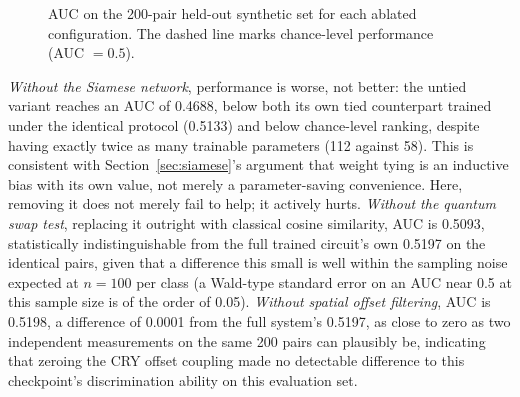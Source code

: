 \documentclass[conference]{IEEEtran}
\begin{document}
\begin{figure}[t]
\centering
{}
\caption{AUC on the 200-pair held-out synthetic set for each ablated configuration. The dashed line marks chance-level performance (AUC $=0.5$).}
\label{fig:ablation}
\end{figure}

\emph{Without the Siamese network}, performance is worse, not better: the untied variant reaches an AUC of 0.4688, below both its own tied counterpart trained under the identical protocol (0.5133) and below chance-level ranking, despite having exactly twice as many trainable parameters (112 against 58). This is consistent with Section~\ref{sec:siamese}'s argument that weight tying is an inductive bias with its own value, not merely a parameter-saving convenience. Here, removing it does not merely fail to help; it actively hurts. \emph{Without the quantum swap test}, replacing it outright with classical cosine similarity, AUC is 0.5093, statistically indistinguishable from the full trained circuit's own 0.5197 on the identical pairs, given that a difference this small is well within the sampling noise expected at $n = 100$ per class (a Wald-type standard error on an AUC near 0.5 at this sample size is of the order of 0.05). \emph{Without spatial offset filtering}, AUC is 0.5198, a difference of 0.0001 from the full system's 0.5197, as close to zero as two independent measurements on the same 200 pairs can plausibly be, indicating that zeroing the CRY offset coupling made no detectable difference to this checkpoint's discrimination ability on this evaluation set.
\end{document}
